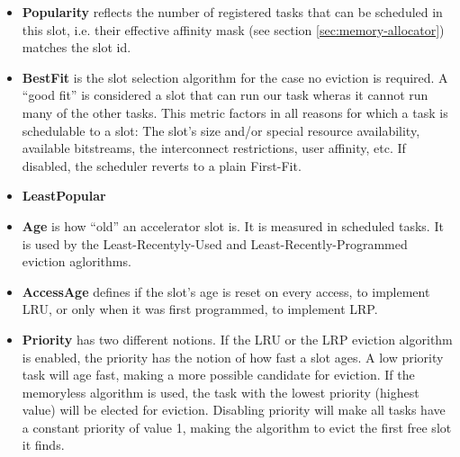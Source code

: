 \begin{itemize}
\item	\textbf{Popularity} reflects the number of registered tasks that can be scheduled in this slot,
	i.e. their effective affinity mask (see section \ref{sec:memory-allocator}) matches the slot id.
\item	\textbf{BestFit} is the slot selection algorithm for the case no eviction is required.
	A ``good fit'' is considered a slot that can run our task wheras it cannot run many of the other tasks. 
	This metric factors in all reasons for which a task
	is schedulable to a slot: The slot's size and/or special resource availability, 
	available bitstreams, the interconnect restrictions, user affinity, etc.
	If disabled, the scheduler reverts to a plain First-Fit.
\item	\textbf{LeastPopular}
\item	\textbf{Age} is how ``old'' an accelerator slot is. It is measured in scheduled tasks.
	It is used by the Least-Recentyly-Used and Least-Recently-Programmed eviction aglorithms.
\item	\textbf{AccessAge} defines if the slot's age is reset on every access, to implement LRU,
	or only when it was first programmed, to implement LRP.
\item	\textbf{Priority} has two different notions.
	If the LRU or the LRP eviction algorithm is enabled, the priority has the notion of how fast a slot
	ages. A low priority task will age fast, making a more possible candidate for eviction.
	If the memoryless algorithm is used, the task with the lowest priority (highest value) will be elected for eviction.
	Disabling priority will make all tasks have a constant priority of value 1, making the algorithm to evict
	the first free slot it finds.

\end{itemize}


